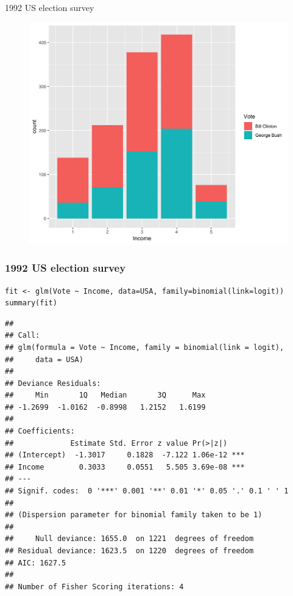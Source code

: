 \documentclass[pdf,handout]{beamer}
\begin{document}
\begin{frame}{1992 US election survey}

\begin{figure}
\includegraphics[width=.7\textwidth]{survey.png}
\end{figure}

\end{frame}

\begin{frame}[fragile]
\frametitle{1992 US election survey}

\begin{lstlisting}[style=R]
fit <- glm(Vote ~ Income, data=USA, family=binomial(link=logit))
summary(fit)
\end{lstlisting}

\tiny
\begin{verbatim}
## 
## Call:
## glm(formula = Vote ~ Income, family = binomial(link = logit), 
##     data = USA)
## 
## Deviance Residuals: 
##     Min       1Q   Median       3Q      Max  
## -1.2699  -1.0162  -0.8998   1.2152   1.6199  
## 
## Coefficients:
##             Estimate Std. Error z value Pr(>|z|)    
## (Intercept)  -1.3017     0.1828  -7.122 1.06e-12 ***
## Income        0.3033     0.0551   5.505 3.69e-08 ***
## ---
## Signif. codes:  0 '***' 0.001 '**' 0.01 '*' 0.05 '.' 0.1 ' ' 1
## 
## (Dispersion parameter for binomial family taken to be 1)
## 
##     Null deviance: 1655.0  on 1221  degrees of freedom
## Residual deviance: 1623.5  on 1220  degrees of freedom
## AIC: 1627.5
## 
## Number of Fisher Scoring iterations: 4
\end{verbatim}
\normalsize

\end{frame}
\end{document}
